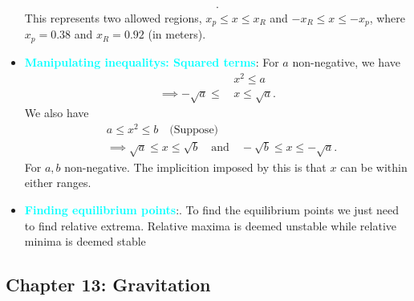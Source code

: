 \documentclass{report}
\begin{document}
\begin{itemize}
\begin{align*}
        .\end{align*}
        \bigbreak \noindent 
        This represents two allowed regions, \(x_p \leq x \leq x_R\) and \(-x_R \leq x \leq -x_p\), where \(x_p = 0.38\) and \(x_R = 0.92\) (in meters).
    \item \textbf{\textcolor{cyan}{Manipulating inequalitys: Squared terms}}: For $a$ non-negative, we have
        \begin{align*}
            &x^{2} \leq a \\
            \implies -\sqrt{a} \leq\, &x \leq \sqrt{a}
        .\end{align*}
        \bigbreak \noindent 
        We also have
        \begin{align*}
           &a \leq x^{2} \leq b \quad \text{(Suppose)} \\
           &\implies \sqrt{a} \leq x \leq \sqrt{b} \quad \text{and} \quad -\sqrt{b} \leq x \leq -\sqrt{a}
        .\end{align*}
        \bigbreak \noindent 
        For $a,b$ non-negative. The implicition imposed by this is that $x$ can be within either ranges.

    \item \textbf{\textcolor{cyan}{Finding equilibrium points}}:. To find the equilibrium points we just need to find relative extrema. Relative maxima is deemed unstable while relative minima is deemed stable

    \end{itemize}

    \pagebreak 
    \subsection{Chapter 13: Gravitation}
    \bigbreak \noindent 
\end{document}
